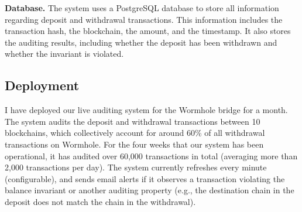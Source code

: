 




\textbf{Database.}
%
The system uses a PostgreSQL database to store all information
regarding deposit and withdrawal transactions. This information
includes the transaction hash, the blockchain, the amount, and the
timestamp.  It also stores the auditing results, including whether the
deposit has been withdrawn and whether the invariant is
violated.


\subsection{Deployment}
%
I have deployed our live auditing system for the Wormhole bridge for a month.
The system audits the deposit and withdrawal transactions between 10
blockchains, which collectively account for around 60\% of all
withdrawal transactions on Wormhole.  For the four weeks that our
system has been operational, it has audited over 60,000 transactions
in total (averaging more than 2,000 transactions per day). The system
currently refreshes every minute (configurable), and sends email
alerts if it observes a transaction violating the balance invariant or
another auditing property (e.g., the destination chain in the deposit
does not match the chain in the withdrawal).

